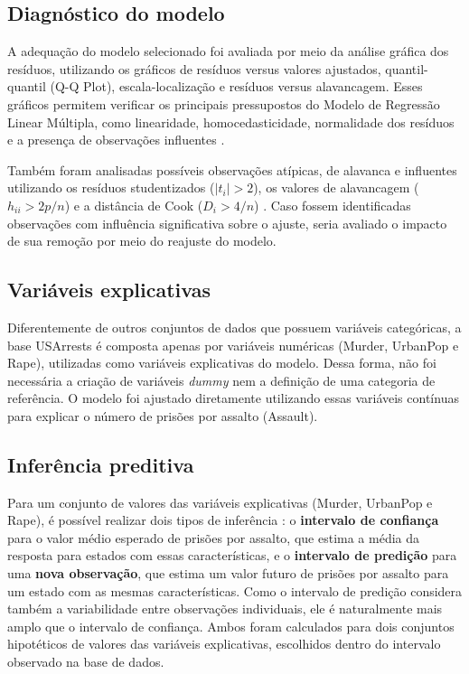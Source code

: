 \documentclass[a4paper]{modeloUFCG} %
\begin{document}
\subsection{Diagnóstico do modelo}\label{diagnuxf3stico-do-modelo}

A adequação do modelo selecionado foi avaliada por meio da análise gráfica dos resíduos, utilizando os gráficos de resíduos versus
valores ajustados, quantil-quantil (Q-Q Plot), escala-localização e resíduos versus alavancagem. Esses gráficos permitem verificar
os principais pressupostos do Modelo de Regressão Linear Múltipla, como linearidade, homocedasticidade, normalidade dos resíduos e
a presença de observações influentes \cite{Kutner2004}.

Também foram analisadas possíveis observações atípicas, de alavanca e influentes utilizando os resíduos studentizados (\(|t_i| > 2\)),
os valores de alavancagem (\(h_{ii} > 2p/n\)) e a distância de Cook (\(D_i > 4/n\)) \cite{Cook1977,CookWeisberg1982,Kutner2004}.
Caso fossem identificadas observações com influência significativa sobre o ajuste, seria avaliado o impacto de sua remoção por meio
do reajuste do modelo.

\subsection{Variáveis explicativas}\label{variuxe1veis-explicativas}

Diferentemente de outros conjuntos de dados que possuem variáveis categóricas, a base USArrests é composta apenas por variáveis
numéricas (Murder, UrbanPop e Rape), utilizadas como variáveis explicativas do modelo. Dessa forma, não foi necessária a
criação de variáveis \emph{dummy} nem a definição de uma categoria de referência. O modelo foi ajustado diretamente utilizando essas
variáveis contínuas para explicar o número de prisões por assalto (Assault).

\subsection{Inferência preditiva}\label{inferuxeancia-preditiva}

Para um conjunto de valores das variáveis explicativas (Murder, UrbanPop e Rape), é possível realizar dois tipos de inferência
\cite{Kutner2004}: o \textbf{intervalo de confiança} para o valor médio esperado de prisões por assalto, que estima a média da resposta
para estados com essas características, e o \textbf{intervalo de predição} para uma \textbf{nova observação}, que estima um valor futuro de
prisões por assalto para um estado com as mesmas características. Como o intervalo de predição considera também a variabilidade entre
observações individuais, ele é naturalmente mais amplo que o intervalo de confiança. Ambos foram calculados para dois conjuntos
hipotéticos de valores das variáveis explicativas, escolhidos dentro do intervalo observado na base de dados.
\end{document}
